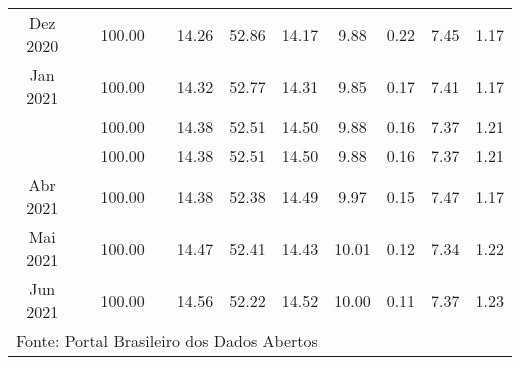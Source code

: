 \documentclass[12pt]{article}
\begin{document}
\begin{landscape}
\begin{table}[htbp]
\begin{adjustbox}{max width=\linewidth}
\begin{tabular}{lllllllllll}
    \multicolumn{1}{c}{Dez 2020} &      & \multicolumn{1}{c}{100.00} &      & \multicolumn{1}{c}{14.26} & \multicolumn{1}{c}{52.86} & \multicolumn{1}{c}{14.17} & \multicolumn{1}{c}{9.88} & \multicolumn{1}{c}{0.22} & \multicolumn{1}{c}{7.45} & \multicolumn{1}{c}{1.17} \\
    \multicolumn{1}{c}{Jan 2021} &      & \multicolumn{1}{c}{100.00} &      & \multicolumn{1}{c}{14.32} & \multicolumn{1}{c}{52.77} & \multicolumn{1}{c}{14.31} & \multicolumn{1}{c}{9.85} & \multicolumn{1}{c}{0.17} & \multicolumn{1}{c}{7.41} & \multicolumn{1}{c}{1.17} \\
    \rowcolor[rgb]{ .851,  .851,  .851} \multicolumn{1}{c}{Fev 2021} &      & \multicolumn{1}{c}{100.00} &      & \multicolumn{1}{c}{14.38} & \multicolumn{1}{c}{52.51} & \multicolumn{1}{c}{14.50} & \multicolumn{1}{c}{9.88} & \multicolumn{1}{c}{0.16} & \multicolumn{1}{c}{7.37} & \multicolumn{1}{c}{1.21} \\
    \rowcolor[rgb]{ .851,  .851,  .851} \multicolumn{1}{c}{Mar 2021} &      & \multicolumn{1}{c}{100.00} &      & \multicolumn{1}{c}{14.38} & \multicolumn{1}{c}{52.51} & \multicolumn{1}{c}{14.50} & \multicolumn{1}{c}{9.88} & \multicolumn{1}{c}{0.16} & \multicolumn{1}{c}{7.37} & \multicolumn{1}{c}{1.21} \\
    \multicolumn{1}{c}{Abr 2021} &      & \multicolumn{1}{c}{100.00} &      & \multicolumn{1}{c}{14.38} & \multicolumn{1}{c}{52.38} & \multicolumn{1}{c}{14.49} & \multicolumn{1}{c}{9.97} & \multicolumn{1}{c}{0.15} & \multicolumn{1}{c}{7.47} & \multicolumn{1}{c}{1.17} \\
    \multicolumn{1}{c}{Mai 2021} &      & \multicolumn{1}{c}{100.00} &      & \multicolumn{1}{c}{14.47} & \multicolumn{1}{c}{52.41} & \multicolumn{1}{c}{14.43} & \multicolumn{1}{c}{10.01} & \multicolumn{1}{c}{0.12} & \multicolumn{1}{c}{7.34} & \multicolumn{1}{c}{1.22} \\
    \multicolumn{1}{c}{Jun 2021} &      & \multicolumn{1}{c}{100.00} &      & \multicolumn{1}{c}{14.56} & \multicolumn{1}{c}{52.22} & \multicolumn{1}{c}{14.52} & \multicolumn{1}{c}{10.00} & \multicolumn{1}{c}{0.11} & \multicolumn{1}{c}{7.37} & \multicolumn{1}{c}{1.23} \\
    \midrule
    \multicolumn{11}{l}{Fonte: Portal Brasileiro dos Dados Abertos} \\
    \end{tabular}%
    \end{adjustbox}
  \label{tab:escolaridade}%
\end{table}%
\end{landscape}
\end{document}
